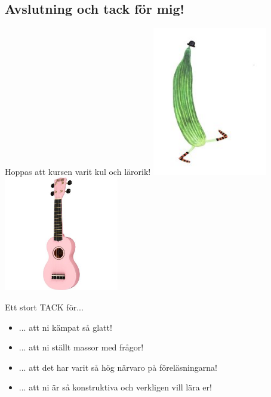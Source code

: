 \documentclass{lecturenotes}
\begin{document}

\subsection{Avslutning och tack för mig!}
\begin{Slide}{Hoppas att kursen varit kul och lärorik!}
\includegraphics[width=5cm]{img/gurka.jpg}\includegraphics[width=5cm]{img/ukulele.jpg}

\end{Slide}

\begin{Slide}{Ett stort TACK för...}
\begin{itemize}
\item ... att ni kämpat så glatt!
\item ... att ni ställt massor med frågor!
\item ... att det har varit så hög närvaro på föreläsningarna!
\item ... att ni är så konstruktiva och verkligen vill lära er!
\end{itemize}
\vspace{2em} \pause

\end{Slide}
\end{document}
